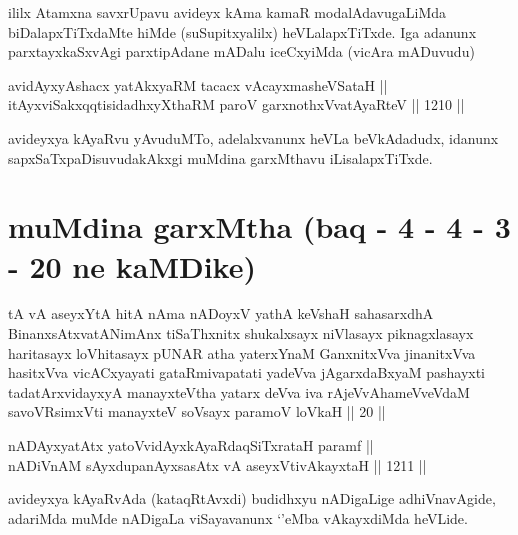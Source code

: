 \begin{artha}
ililx Atamxna savxrUpavu avideyx kAma kamaR modalAdavugaLiMda biDalapxTiTxdaMte hiMde (suSupitxyalilx) heVLalapxTiTxde. Iga adanunx parxtayxkaSxvAgi parxtipAdane mADalu iceCxyiMda (vicAra mADuvudu)
\end{artha}


\begin{shl}
avidAyxyAshacx yatAkxyaRM tacacx vAcayxmasheVSataH || \\
itAyxviSakxqqtisidadhxyXthaRM paroV garxnothxV\s vatAyaRteV ||  1210 ||  
\end{shl}

\begin{artha}
avideyxya kAyaRvu yAvuduMTo, adelalxvanunx heVLa beVkAdadudx, idanunx sapxSaTxpaDisuvudakAkxgi muMdina garxMthavu iLisalapxTiTxde.
\end{artha}

\section*{muMdina garxMtha (baq - 4 - 4 - 3 - 20 ne kaMDike)}

\begin{shl}
tA vA aseyxYtA hitA nAma nADoyxV yathA keVshaH sahasarxdhA BinanxsAtxvatANimAnx tiSaThxnitx shukalxsayx niVlasayx piknagxlasayx haritasayx loVhitasayx pUNAR atha yaterxYnaM GanxnitxVva jinanitxVva hasitxVva vicACxyayati gataRmivapatati yadeVva jAgarxdaBxyaM pashayxti tadatArxvidayxyA manayxteV\s tha yatarx deVva iva rAjeVvAhameVveVdaM savoVR\s simxVti manayxteV soV\s sayx paramoV loVkaH || 20 ||
\end{shl}



\begin{shl}
nADAyxyatAtx yatoV\s vidAyxkAyaRdaqSiTxrataH paramf || \\
nADiVnAM sAyxdupanAyxsasAtx vA aseyxVtivAkayxtaH ||  1211 ||  
\end{shl}

\begin{artha}
avideyxya kAyaRvAda (kataqRtAvxdi) budidhxyu nADigaLige adhiVnavAgide, adariMda muMde nADigaLa viSayavanunx `\stext'eMba vAkayxdiMda heVLide.
\end{artha}


